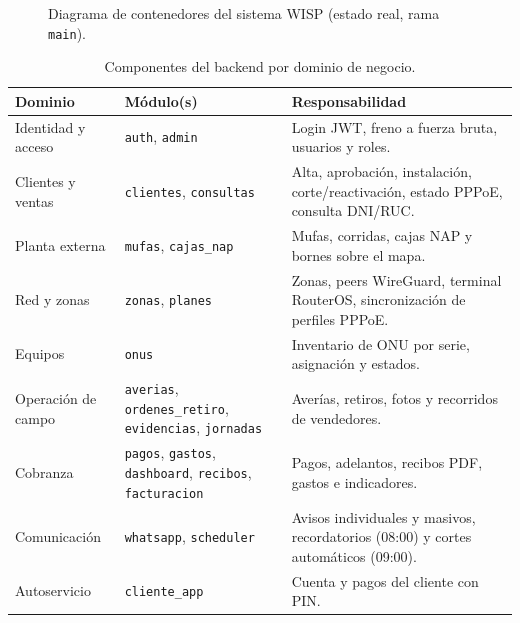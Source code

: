\begin{figure}[H]
\caption{Diagrama de contenedores del sistema WISP (estado real, rama \texttt{main}).}
\label{fig:ce02-componentes}
\end{figure}

\begin{table}[htbp]
\centering
\caption{Componentes del backend por dominio de negocio.}
\label{tab:ce02-modulos}
\small
\begin{tabularx}{\textwidth}{L{3.2cm}L{3.2cm}X}
\toprule
\textbf{Dominio} & \textbf{Módulo(s)} & \textbf{Responsabilidad} \\
\midrule
Identidad y acceso & \texttt{auth}, \texttt{admin} & Login JWT, freno a fuerza bruta, usuarios y roles. \\
Clientes y ventas & \texttt{clientes}, \texttt{consultas} & Alta, aprobación, instalación, corte/reactivación, estado PPPoE, consulta DNI/RUC. \\
Planta externa & \texttt{mufas}, \texttt{cajas\_nap} & Mufas, corridas, cajas NAP y bornes sobre el mapa. \\
Red y zonas & \texttt{zonas}, \texttt{planes} & Zonas, peers WireGuard, terminal RouterOS, sincronización de perfiles PPPoE. \\
Equipos & \texttt{onus} & Inventario de ONU por serie, asignación y estados. \\
Operación de campo & \texttt{averias}, \texttt{ordenes\_retiro}, \texttt{evidencias}, \texttt{jornadas} & Averías, retiros, fotos y recorridos de vendedores. \\
Cobranza & \texttt{pagos}, \texttt{gastos}, \texttt{dashboard}, \texttt{recibos}, \texttt{facturacion} & Pagos, adelantos, recibos PDF, gastos e indicadores. \\
Comunicación & \texttt{whatsapp}, \texttt{scheduler} & Avisos individuales y masivos, recordatorios (08:00) y cortes automáticos (09:00). \\
Autoservicio & \texttt{cliente\_app} & Cuenta y pagos del cliente con PIN. \\
\bottomrule
\end{tabularx}
\end{table}

